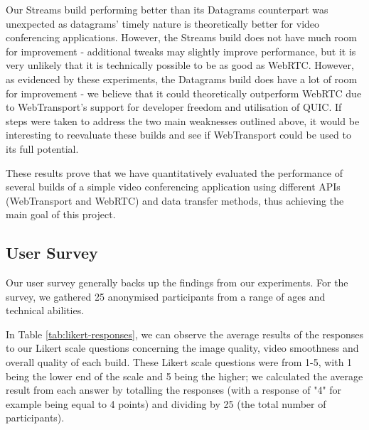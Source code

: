Our Streams build performing better than its Datagrams counterpart was unexpected as datagrams' timely nature is theoretically better for video conferencing applications. However, the Streams build does not have much room for improvement - additional tweaks may slightly improve performance, but it is very unlikely that it is technically possible to be as good as WebRTC. However, as evidenced by these experiments, the Datagrams build does have a lot of room for improvement - we believe that it could theoretically outperform WebRTC due to WebTransport's support for developer freedom and utilisation of QUIC. If steps were taken to address the two main weaknesses outlined above, it would be interesting to reevaluate these builds and see if WebTransport could be used to its full potential.

These results prove that we have quantitatively evaluated the performance of several builds of a simple video conferencing application using different APIs (WebTransport and WebRTC) and data transfer methods, thus achieving the main goal of this project.
\hfill{} \\
\subsection{User Survey}
Our user survey generally backs up the findings from our experiments. For the survey, we gathered 25 anonymised participants from a range of ages and technical abilities.

In Table \ref{tab:likert-responses}, we can observe the average results of the responses to our Likert scale questions concerning the image quality, video smoothness and overall quality of each build. These Likert scale questions were from 1-5, with 1 being the lower end of the scale and 5 being the higher; we calculated the average result from each answer by totalling the responses (with a response of "4" for example being equal to 4 points) and dividing by 25 (the total number of participants). 

